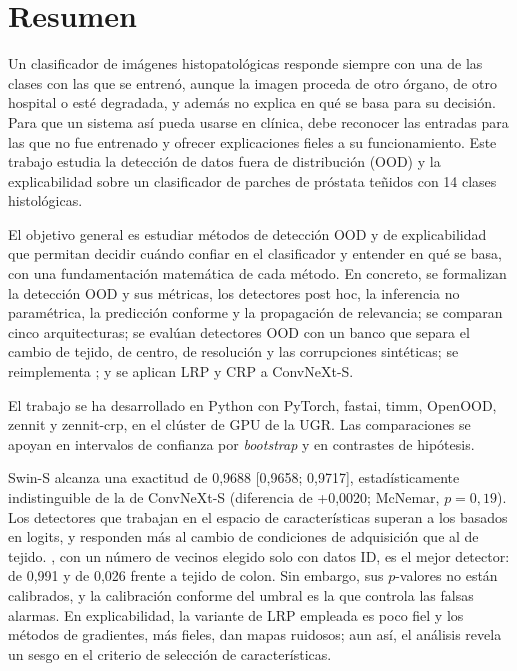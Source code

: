 %

\chapter{Resumen}

Un clasificador de imágenes histopatológicas responde siempre con una de las clases con las que se entrenó, aunque la imagen proceda de otro órgano, de otro hospital o esté degradada, y además no explica en qué se basa para su decisión. Para que un sistema así pueda usarse en clínica, debe reconocer las entradas para las que no fue entrenado y ofrecer explicaciones fieles a su funcionamiento. Este trabajo estudia la detección de datos fuera de distribución (OOD) y la explicabilidad sobre un clasificador de parches de próstata teñidos con 14 clases histológicas.

El objetivo general es estudiar métodos de detección OOD y de explicabilidad que permitan decidir cuándo confiar en el clasificador y entender en qué se basa, con una fundamentación matemática de cada método. En concreto, se formalizan la detección OOD y sus métricas, los detectores post hoc, la inferencia no paramétrica, la predicción conforme y la propagación de relevancia; se comparan cinco arquitecturas; se evalúan detectores OOD con un banco que separa el cambio de tejido, de centro, de resolución y las corrupciones sintéticas; se reimplementa \stoodx; y se aplican LRP y CRP a ConvNeXt-S.

El trabajo se ha desarrollado en Python con PyTorch, fastai, timm, OpenOOD, zennit y zennit-crp, en el clúster de GPU de la UGR. Las comparaciones se apoyan en intervalos de confianza por \emph{bootstrap} y en contrastes de hipótesis.

Swin-S alcanza una exactitud de 0,9688 [0,9658; 0,9717], estadísticamente indistinguible de la de ConvNeXt-S (diferencia de +0,0020; McNemar, $p = 0{,}19$). Los detectores que trabajan en el espacio de características superan a los basados en logits, y responden más al cambio de condiciones de adquisición que al de tejido. \stoodx, con un número de vecinos elegido solo con datos ID, es el mejor detector: \AUROC de 0,991 y  de 0,026 frente a tejido de colon. Sin embargo, sus $p$-valores no están calibrados, y la calibración conforme del umbral es la que controla las falsas alarmas. En explicabilidad, la variante de LRP empleada es poco fiel y los métodos de gradientes, más fieles, dan mapas ruidosos; aun así, el análisis revela un sesgo en el criterio de selección de características. 

